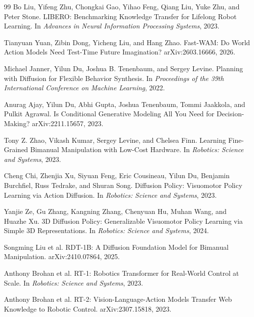 \documentclass[10pt,twocolumn,letterpaper]{article}
\begin{document}
\begin{thebibliography}{99}
Bo Liu, Yifeng Zhu, Chongkai Gao, Yihao Feng, Qiang Liu, Yuke Zhu, and Peter
Stone.
\newblock LIBERO: Benchmarking Knowledge Transfer for Lifelong Robot Learning.
\newblock In \emph{Advances in Neural Information Processing Systems}, 2023.

Tianyuan Yuan, Zibin Dong, Yicheng Liu, and Hang Zhao.
\newblock Fast-WAM: Do World Action Models Need Test-Time Future Imagination?
\newblock arXiv:2603.16666, 2026.

Michael Janner, Yilun Du, Joshua B. Tenenbaum, and Sergey Levine.
\newblock Planning with Diffusion for Flexible Behavior Synthesis.
\newblock In \emph{Proceedings of the 39th International Conference on Machine
Learning}, 2022.

Anurag Ajay, Yilun Du, Abhi Gupta, Joshua Tenenbaum, Tommi Jaakkola, and Pulkit
Agrawal.
\newblock Is Conditional Generative Modeling All You Need for Decision-Making?
\newblock arXiv:2211.15657, 2023.

Tony Z. Zhao, Vikash Kumar, Sergey Levine, and Chelsea Finn.
\newblock Learning Fine-Grained Bimanual Manipulation with Low-Cost Hardware.
\newblock In \emph{Robotics: Science and Systems}, 2023.

Cheng Chi, Zhenjia Xu, Siyuan Feng, Eric Cousineau, Yilun Du, Benjamin
Burchfiel, Russ Tedrake, and Shuran Song.
\newblock Diffusion Policy: Visuomotor Policy Learning via Action Diffusion.
\newblock In \emph{Robotics: Science and Systems}, 2023.

Yanjie Ze, Gu Zhang, Kangning Zhang, Chenyuan Hu, Muhan Wang, and Huazhe Xu.
\newblock 3D Diffusion Policy: Generalizable Visuomotor Policy Learning via
Simple 3D Representations.
\newblock In \emph{Robotics: Science and Systems}, 2024.

Songming Liu et al.
\newblock RDT-1B: A Diffusion Foundation Model for Bimanual Manipulation.
\newblock arXiv:2410.07864, 2025.

Anthony Brohan et al.
\newblock RT-1: Robotics Transformer for Real-World Control at Scale.
\newblock In \emph{Robotics: Science and Systems}, 2023.

Anthony Brohan et al.
\newblock RT-2: Vision-Language-Action Models Transfer Web Knowledge to Robotic
Control.
\newblock arXiv:2307.15818, 2023.


\end{thebibliography}
\end{document}
